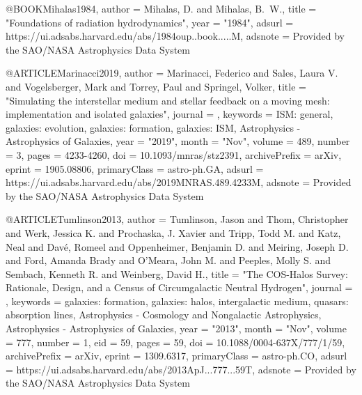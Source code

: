 \documentclass[useAMS,usenatbib]{mnras}
\begin{document}
@BOOK{Mihalas1984,
       author = {{Mihalas}, D. and {Mihalas}, B.~W.},
        title = "{Foundations of radiation hydrodynamics}",
         year = "1984",
       adsurl = {https://ui.adsabs.harvard.edu/abs/1984oup..book.....M},
      adsnote = {Provided by the SAO/NASA Astrophysics Data System}
}


@ARTICLE{Marinacci2019,
       author = {{Marinacci}, Federico and {Sales}, Laura V. and {Vogelsberger}, Mark and
         {Torrey}, Paul and {Springel}, Volker},
        title = "{Simulating the interstellar medium and stellar feedback on a moving mesh: implementation and isolated galaxies}",
      journal = {\mnras},
     keywords = {ISM: general, galaxies: evolution, galaxies: formation, galaxies: ISM, Astrophysics - Astrophysics of Galaxies},
         year = "2019",
        month = "Nov",
       volume = {489},
       number = {3},
        pages = {4233-4260},
          doi = {10.1093/mnras/stz2391},
archivePrefix = {arXiv},
       eprint = {1905.08806},
 primaryClass = {astro-ph.GA},
       adsurl = {https://ui.adsabs.harvard.edu/abs/2019MNRAS.489.4233M},
      adsnote = {Provided by the SAO/NASA Astrophysics Data System}
}

@ARTICLE{Tumlinson2013,
       author = {{Tumlinson}, Jason and {Thom}, Christopher and {Werk}, Jessica K. and
         {Prochaska}, J. Xavier and {Tripp}, Todd M. and {Katz}, Neal and
         {Dav{\'e}}, Romeel and {Oppenheimer}, Benjamin D. and
         {Meiring}, Joseph D. and {Ford}, Amanda Brady and {O'Meara}, John M. and
         {Peeples}, Molly S. and {Sembach}, Kenneth R. and {Weinberg}, David H.},
        title = "{The COS-Halos Survey: Rationale, Design, and a Census of Circumgalactic Neutral Hydrogen}",
      journal = {\apj},
     keywords = {galaxies: formation, galaxies: halos, intergalactic medium, quasars: absorption lines, Astrophysics - Cosmology and Nongalactic Astrophysics, Astrophysics - Astrophysics of Galaxies},
         year = "2013",
        month = "Nov",
       volume = {777},
       number = {1},
          eid = {59},
        pages = {59},
          doi = {10.1088/0004-637X/777/1/59},
archivePrefix = {arXiv},
       eprint = {1309.6317},
 primaryClass = {astro-ph.CO},
       adsurl = {https://ui.adsabs.harvard.edu/abs/2013ApJ...777...59T},
      adsnote = {Provided by the SAO/NASA Astrophysics Data System}
}
\end{document}
